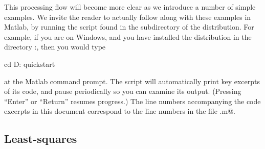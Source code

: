 \documentclass[12pt]{article}
\begin{document}
This processing flow will become more clear as we introduce
a number of simple examples. We invite the reader to actually follow
along with these examples in Matlab, by running the \verb@quickstart@
script found in the \verb@examples@ subdirectory of the \cvx distribution. 
For example,
if you are on Windows, and you have installed the \cvx distribution
in the directory \verb@D:\Matlab\cvx@, then you would type
\begin{code}
	cd D:\Matlab\cvx\examples
	quickstart
\end{code}
at the Matlab command prompt.
The script will automatically print key excerpts of its code, and
pause periodically so you can examine its output. (Pressing ``Enter''
or ``Return'' resumes progress.) 
The line numbers accompanying the code excerpts in this
document correspond to the line numbers in the file \verb@quickstart.m@.

\subsection{Least-squares}
\label{sec:leastsquares}
\end{document}

